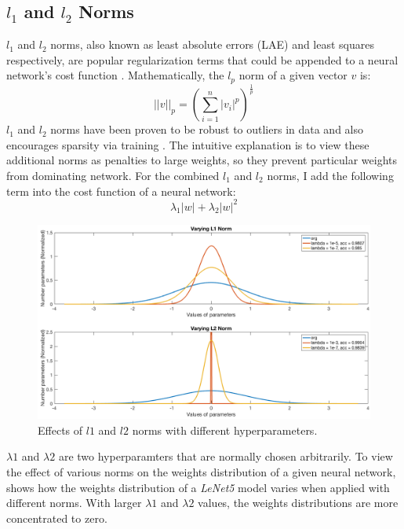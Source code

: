 \documentclass[a4paper,12pt]{report}
\begin{document}
\subsection{$l_1$ and $l_2$ Norms}
$l_1$ and $l_2$ norms, also known as least absolute errors (LAE) and least squares
respectively, are popular regularization terms that could be appended to a
neural network's cost function \cite{nie2010efficient}.
Mathematically, the $l_p$ norm of a given vector $v$ is:
\begin{equation}
    ||v||_p = (\sum_{i=1}^{n}|v_i|^p)^{\frac{1}{p}}
\end{equation}
$l_1$ and $l_2$ norms have been proven to be robust to outliers in
data and also encourages sparsity via training \cite{nie2010efficient}.
The intuitive explanation is to view these additional norms as penalties to
large weights, so they prevent particular weights from dominating network.
For the combined $l_1$ and $l_2$ norms, I add the following term into the cost
function of a neural network:
\begin{equation}
\lambda_{1}|w| + \lambda_{2}|w|^{2}
\label{equ:norms}
\end{equation}

\begin{figure}[!h]
\centering
\includegraphics[width=\textwidth]{l1l2norm.png}
\caption{\label{fig:l1l2norm}Effects of $l1$ and $l2$ norms with different hyperparameters.}
\end{figure}

$\lambda{1}$ and $\lambda{2}$ are two hyperparamters that
are normally chosen arbitrarily.
To view the effect of various norms on the weights distribution of a
given neural network,  shows how the weights distribution
of a \textit{LeNet5} model varies when applied with different norms.
With larger $\lambda{1}$ and $\lambda{2}$ values, the weights distributions
are more concentrated to zero.
\end{document}
